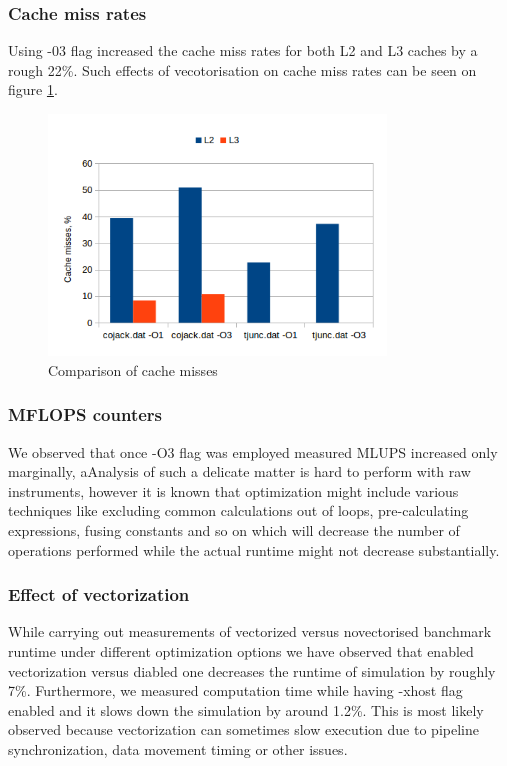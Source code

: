 \documentclass{article}
\begin{document}
\subsubsection{Cache miss rates}
Using -03 flag increased the cache miss rates for both L2 and L3 caches by a rough 22\%. Such effects of vecotorisation on cache miss rates can be seen on figure \ref{fig:2}.
\begin{figure}[h!]
	\begin{center}
		\includegraphics[width=0.8\textwidth]{cache-misses}
		\caption{Comparison of cache misses}
		\label{fig:2}
	\end{center}
\end{figure}

\subsubsection{MFLOPS counters}
We observed that once -O3 flag was employed measured MLUPS increased only marginally, aAnalysis of such a delicate matter is hard to perform with raw instruments, however it is known that optimization might include various techniques like excluding common calculations out of loops, pre-calculating expressions, fusing constants and so on which will decrease the number of operations performed while the actual runtime might not decrease substantially.

\subsubsection{Effect of vectorization}
While carrying out measurements of vectorized versus novectorised banchmark runtime under different optimization options we have observed that enabled vectorization versus diabled one decreases the runtime of simulation by roughly 7\%. Furthermore, we measured computation time while having -xhost flag enabled and it slows down the simulation by around 1.2\%. This is most likely observed because vectorization can sometimes slow execution due to pipeline synchronization, data movement timing or other issues.
\end{document}
